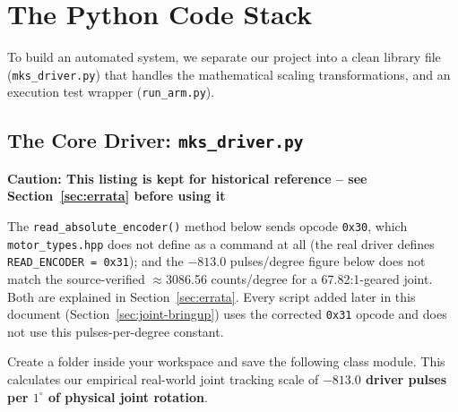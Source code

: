 \documentclass[11pt,letterpaper]{article}
\newenvironment{caution}[1]{%
    \par\addvspace{8pt}%
    \noindent{\color{cautionred}\rule{\linewidth}{0.8pt}}\par\vspace{2pt}
    \noindent\textbf{\color{cautionred}Caution: #1}\par\vspace{2pt}
}{%
    \par\vspace{2pt}\noindent{\color{cautionred}\rule{\linewidth}{0.4pt}}%
    \par\addvspace{8pt}%
}
\begin{document}
\section{The Python Code Stack}
To build an automated system, we separate our project into a clean library file (\texttt{mks\_driver.py}) that handles the mathematical scaling transformations, and an execution test wrapper (\texttt{run\_arm.py}).

\subsection{The Core Driver: \texttt{mks\_driver.py}}
\begin{caution}{This listing is kept for historical reference -- see Section~\ref{sec:errata} before using it}
The \texttt{read\_absolute\_encoder()} method below sends opcode \texttt{0x30}, which \texttt{motor\_types.hpp} does not define as a command at all (the real driver defines \texttt{READ\_ENCODER = 0x31}); and the $-813.0$ pulses/degree figure below does not match the source-verified $\approx$3086.56 counts/degree for a 67.82:1-geared joint. Both are explained in Section~\ref{sec:errata}. Every script added later in this document (Section~\ref{sec:joint-bringup}) uses the corrected \texttt{0x31} opcode and does not use this pulses-per-degree constant.
\end{caution}
Create a folder inside your workspace and save the following class module. This calculates our empirical real-world joint tracking scale of \textbf{$-813.0$ driver pulses per $1^\circ$ of physical joint rotation}.
\end{document}
